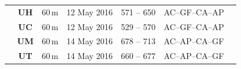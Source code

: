 \documentclass{sfuthesis}
\begin{document}
\begin{table}
\begin{tabular}{ccccccl}
                                                                             & \textbf{UH}                                                  & 60\,m                                                                     & 12 May 2016   & 571 -- 650                                                                 & AC--GF--CA--AP                                                     &                                                                                                                                                                                                                                                  \\
                                                                             & \textbf{UC}                                                  & 60\,m                                                                     & 12 May 2016   & 529 -- 570                                                                 & AC--GF--CA--AP                                                     &                                                                                                                                                                                                                                                  \\
                                                                             & \textbf{UM}                                                  & 60\,m                                                                     & 14 May 2016   & 678 -- 713                                                                 & AC--AP--CA--GF                                                     &                                                                                                                                                                                                                                                  \\
                                                                             & \textbf{UT}                                                  & 60\,m                                                                     & 14 May 2016   & 660 -- 677                                                                 & AC--AP--CA--GF                                                     &                                                                                                                                                                                                                                                 
\end{tabular}
\end{table}
\end{document}
